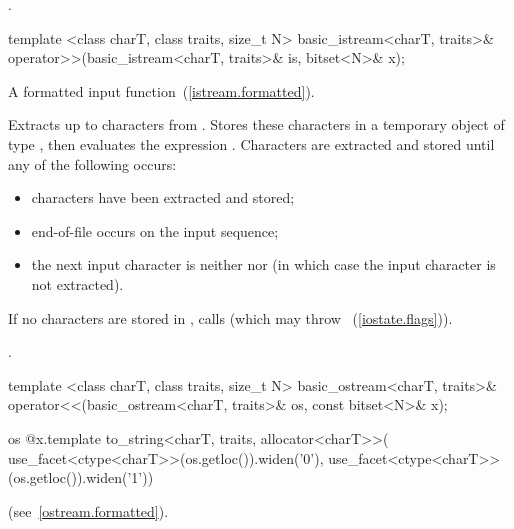 \begin{itemdescr}
\pnum
\returns
{}.
\end{itemdescr}

%
\begin{itemdecl}
template <class charT, class traits, size_t N>
  basic_istream<charT, traits>&
  operator>>(basic_istream<charT, traits>& is, bitset<N>& x);
\end{itemdecl}

\begin{itemdescr}
\pnum
A formatted input function~(\ref{istream.formatted}).

\pnum
\effects
Extracts up to  characters from .
Stores these characters in a temporary object  of type
,
then evaluates the expression
.
Characters are extracted and stored until any of the following occurs:

\begin{itemize}
\item
{} characters have been extracted and stored;
\item
end-of-file occurs on the input sequence;%
\item
the next input character is neither
nor
(in which case the input character is not extracted).
\end{itemize}

\pnum
If no characters are stored in , calls
(which may throw
~(\ref{iostate.flags})).

\pnum
\returns
{}.
\end{itemdescr}

%
\begin{itemdecl}
template <class charT, class traits, size_t N>
  basic_ostream<charT, traits>&
  operator<<(basic_ostream<charT, traits>& os, const bitset<N>& x);
\end{itemdecl}

\begin{itemdescr}
\pnum
\returns
\begin{codeblock}
os @\shl@ x.template to_string<charT, traits, allocator<charT>>(
  use_facet<ctype<charT>>(os.getloc()).widen('0'),
  use_facet<ctype<charT>>(os.getloc()).widen('1'))
\end{codeblock}
(see~\ref{ostream.formatted}).
\end{itemdescr}

